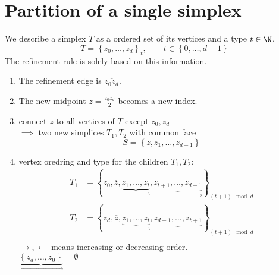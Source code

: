 \section{Partition of a single simplex}
\begin{definition}
	We describe a simplex $T$ as a ordered set of its vertices and a type $t\in \N$.
	\begin{equation*}
		T = \left\{z_{0}, \dots , z_{d}\right\}_{t}, \qquad t\in \left\{ 0,\dots ,d-1 \right\}
		
	\end{equation*}
	The refinement rule is solely based on this information.
	\begin{enumerate}[label = \arabic*)]
		\item The refinement edge is $\overline{z_{0}z_{d}}$.
		\item The new midpoint $\bar{z}= \frac{\overline{z_{0}z_{d}}}{2}$ becomes a new index.
		\item connect $\bar{z}$ to all vertices of $T$ except $z_{0},z_{d}$ \\
			$\implies$ two new simplices $T_{1},T_{2}$ with common face 
			 \begin{equation*}
				S = \left\{\overline{z},z_{1},\dots ,z_{d-1} \right\}
			\end{equation*}
		\item vertex oredring and type for the children $T_{1},T_{2}$:
			\begin{align*}
				T_{1}&= \left\{ z_{0},\overline{z},\underbrace{z_{1},\dots ,z_{t}}_{\rightarrow},\underbrace{z_{t+1},\dots ,z_{d-1}}_{{\rightarrow}} \right\}_{(t+1)\mod d}\\
				T_{2}&= \left\{ z_{d},\overline{z},\underbrace{z_{1},\dots ,z_{t}}_{\rightarrow},\underbrace{z_{d-1},\dots ,z_{t+1}}_{{\leftarrow}} \right\}_{(t+1)\mod d}\\
			\end{align*}
		$\rightarrow, \leftarrow$ means increasing or decreasing order.	\\
		$\underbrace{\left\{z_{d},\dots ,z_{0}\right\} }_{\rightarrow} =\emptyset$		
	\end{enumerate}
\end{definition}
